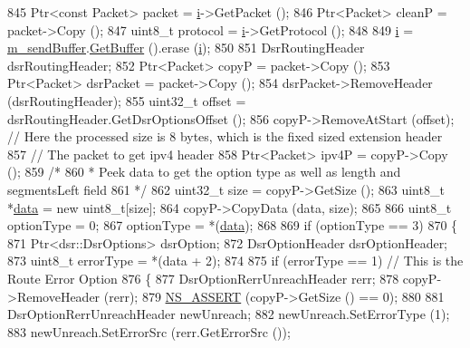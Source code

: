 \begin{DoxyCode}
845           Ptr<const Packet> packet = \hyperlink{bernuolliDistribution_8m_a6f6ccfcf58b31cb6412107d9d5281426}{i}->GetPacket ();
846           Ptr<Packet> cleanP = packet->Copy ();
847           uint8\_t protocol = \hyperlink{bernuolliDistribution_8m_a6f6ccfcf58b31cb6412107d9d5281426}{i}->GetProtocol ();
848 
849           \hyperlink{bernuolliDistribution_8m_a6f6ccfcf58b31cb6412107d9d5281426}{i} = \hyperlink{classns3_1_1dsr_1_1DsrRouting_a887ae39d7060171753c0605d5c120549}{m\_sendBuffer}.\hyperlink{classns3_1_1dsr_1_1DsrSendBuffer_ad21223587fd6ae3a42b124416e877305}{GetBuffer} ().erase (\hyperlink{bernuolliDistribution_8m_a6f6ccfcf58b31cb6412107d9d5281426}{i});
850 
851           DsrRoutingHeader dsrRoutingHeader;
852           Ptr<Packet> copyP = packet->Copy ();
853           Ptr<Packet> dsrPacket = packet->Copy ();
854           dsrPacket->RemoveHeader (dsrRoutingHeader);
855           uint32\_t offset = dsrRoutingHeader.GetDsrOptionsOffset ();
856           copyP->RemoveAtStart (offset); \textcolor{comment}{// Here the processed size is 8 bytes, which is the fixed sized
       extension header}
857           \textcolor{comment}{// The packet to get ipv4 header}
858           Ptr<Packet> ipv4P = copyP->Copy ();
859           \textcolor{comment}{/*}
860 \textcolor{comment}{           * Peek data to get the option type as well as length and segmentsLeft field}
861 \textcolor{comment}{           */}
862           uint32\_t size = copyP->GetSize ();
863           uint8\_t *\hyperlink{topology-example-sim_8cc_a26c65296e316af77b787dc77469bb2a4}{data} = \textcolor{keyword}{new} uint8\_t[size];
864           copyP->CopyData (data, size);
865 
866           uint8\_t optionType = 0;
867           optionType = *(\hyperlink{topology-example-sim_8cc_a26c65296e316af77b787dc77469bb2a4}{data});
868 
869           \textcolor{keywordflow}{if} (optionType == 3)
870             \{
871               Ptr<dsr::DsrOptions> dsrOption;
872               DsrOptionHeader dsrOptionHeader;
873               uint8\_t errorType = *(data + 2);
874 
875               \textcolor{keywordflow}{if} (errorType == 1) \textcolor{comment}{// This is the Route Error Option}
876                 \{
877                   DsrOptionRerrUnreachHeader rerr;
878                   copyP->RemoveHeader (rerr);
879                   \hyperlink{assert_8h_a6dccdb0de9b252f60088ce281c49d052}{NS\_ASSERT} (copyP->GetSize () == 0);
880 
881                   DsrOptionRerrUnreachHeader newUnreach;
882                   newUnreach.SetErrorType (1);
883                   newUnreach.SetErrorSrc (rerr.GetErrorSrc ());

\end{DoxyCode}
